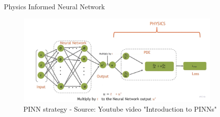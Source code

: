 \begin{frame}{Physics Informed Neural Network}
    
    \begin{figure}
        \centering
        \includegraphics[width=0.9\textwidth]{images/loss.jpg}
        \caption{PINN strategy - Source: Youtube video "Introduction to PINNs"}
    \end{figure}

\end{frame}